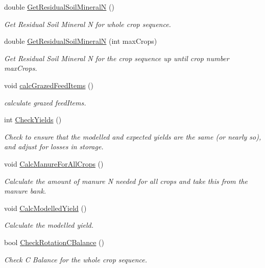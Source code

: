 \begin{DoxyCompactItemize}
double \mbox{\hyperlink{class_crop_sequence_class_a3401eac2451cc44771fdd81889e201c2}{Get\+Residual\+Soil\+MineralN}} ()
\begin{DoxyCompactList}\small\item\em Get Residual Soil Mineral N for whole crop sequence. \end{DoxyCompactList}\item 
double \mbox{\hyperlink{class_crop_sequence_class_a2347aff3c6945f3394ba5ca4ec8ea204}{Get\+Residual\+Soil\+MineralN}} (int max\+Crops)
\begin{DoxyCompactList}\small\item\em Get Residual Soil Mineral N for the crop sequence up until crop number max\+Crops. \end{DoxyCompactList}\item 
void \mbox{\hyperlink{class_crop_sequence_class_a1274090ce08e244b75f7e0475c53201f}{calc\+Grazed\+Feed\+Items}} ()
\begin{DoxyCompactList}\small\item\em calculate grazed feed\+Items. \end{DoxyCompactList}\item 
int \mbox{\hyperlink{class_crop_sequence_class_a9367b587026218a44ff1806988f3ee65}{Check\+Yields}} ()
\begin{DoxyCompactList}\small\item\em Check to ensure that the modelled and expected yields are the same (or nearly so), and adjust for losses in storage. \end{DoxyCompactList}\item 
void \mbox{\hyperlink{class_crop_sequence_class_a907b438fe2a9d3ada68b32472492f81d}{Calc\+Manure\+For\+All\+Crops}} ()
\begin{DoxyCompactList}\small\item\em Calculate the amount of manure N needed for all crops and take this from the manure bank. \end{DoxyCompactList}\item 
void \mbox{\hyperlink{class_crop_sequence_class_aeda543e18a2c235b31d36a41130f17e7}{Calc\+Modelled\+Yield}} ()
\begin{DoxyCompactList}\small\item\em Calculate the modelled yield. \end{DoxyCompactList}\item 
bool \mbox{\hyperlink{class_crop_sequence_class_acf5cb20fa20f54ab86094e0f1bcdf07d}{Check\+Rotation\+C\+Balance}} ()
\begin{DoxyCompactList}\small\item\em Check C Balance for the whole crop sequence. \end{DoxyCompactList}\item 

\end{DoxyCompactItemize}
